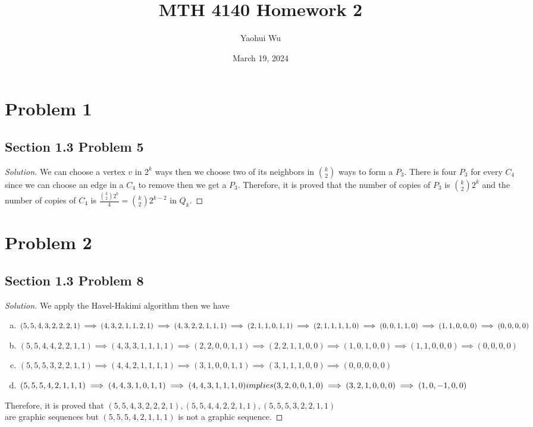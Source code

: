 \documentclass[12pt]{article}
\title{MTH 4140 Homework 2}
\author{Yaohui Wu}
\date{March 19, 2024}
\newenvironment*{solution}{\begin{proof}[Solution]}{\end{proof}}
\begin{document}
\maketitle
\section*{Problem 1}
\subsection*{Section 1.3 Problem 5}
\begin{solution}
    We can choose a vertex \(v\) in \(2^k\) ways then we choose two of its
    neighbors in \(\binom{k}{2}\) ways to form a \(P_3\). There is four \(P_3
    \) for every \(C_4\) since we can choose an edge in a \(C_4\) to remove
    then we get a \(P_3\). Therefore, it is proved that the number of copies
    of \(P_3\) is \(\binom{k}{2}2^k\) and the number of copies of \(C_4\) is
    \(\frac{\binom{k}{2}2^k}{4}=\binom{k}{2}2^{k-2}\) in \(Q_k\).
\end{solution}
\section*{Problem 2}
\subsection*{Section 1.3 Problem 8}
\begin{solution}
    We apply the Havel-Hakimi algorithm then we have
    \begin{enumerate}[(a)]
        \item \((5,5,4,3,2,2,2,1)\implies(4,3,2,1,1,2,1)\implies(4,3,2,2,1,1,1
        )\implies(2,1,1,0,1,1) \\ \implies(2,1,1,1,1,0)\implies(0,0,1,1,0)
        \implies(1,1,0,0,0)\implies(0,0,0,0)\)
        \item \((5,5,4,4,2,2,1,1)\implies(4,3,3,1,1,1,1)\implies(2,2,0,0,1,1)
        \implies(2,2,1,1,0,0)\implies(1,0,1,0,0)\implies(1,1,0,0,0)\implies(0,
        0,0,0)\)
        \item \((5,5,5,3,2,2,1,1)\implies(4,4,2,1,1,1,1)\implies(3,1,0,0,1,1)
        \implies(3,1,1,1,0,0)\implies(0,0,0,0,0)\)
        \item \((5,5,5,4,2,1,1,1)\implies(4,4,3,1,0,1,1)\implies(4,4,3,1,1,1,0
        )\ \\ implies(3,2,0,0,1,0)\implies(3,2,1,0,0,0)\implies(1,0,-1,0,0)\)
    \end{enumerate}
    Therefore, it is proved that \((5,5,4,3,2,2,2,1),(5,5,4,4,2,2,1,1),(5,5,5,3
    ,2,2,1,1)\) \\ are graphic sequences but \((5,5,5,4,2,1,1,1)\)  is not a
    graphic sequence.
\end{solution}
\end{document}
